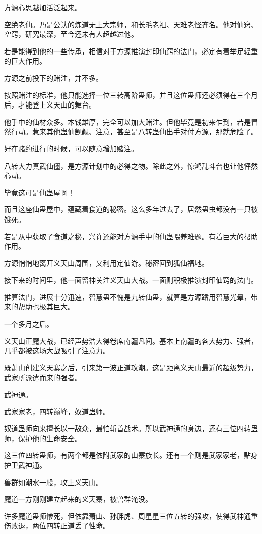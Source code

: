 \begin{this_body}
方源心思越加活泛起来。

空绝老仙。乃是公认的炼道无上大宗师，和长毛老祖、天难老怪齐名。他对仙窍、空窍，研究最深，至今还未有人超越过他。

若是能得到他的一些传承，相信对于方源推演封印仙窍的法门，必定有着举足轻重的巨大作用。

方源之前投下的赌注，并不多。

按照赌注的标准，他只能选择一位三转高阶蛊师，并且这位蛊师还必须得在三个月后，才能登上义天山的舞台。

他手中的仙材众多。本钱雄厚，完全可以加大赌注。但他毕竟是初来乍到，若是冒然行动。惹来其他蛊仙觊觎、注意，甚至是八转蛊仙出手对付方源，那就危险了。

好在赌约进行的时候，可以随意增加赌注。

八转大力真武仙僵，是方源计划中的必得之物。除此之外，惊鸿乱斗台也让他怦然心动。

毕竟这可是仙蛊屋啊！

而且这座仙蛊屋中，蕴藏着食道的秘密。这么多年过去了，居然蛊虫都没有一只被饿死。

若是从中获取了食道之秘，兴许还能对方源手中的仙蛊喂养难题。有着巨大的帮助作用。

方源悄悄地离开义天山周围，又利用定仙游。秘密回到狐仙福地。

接下来的时间里，他一面留神关注义天山大战。一面则积极推演封印仙窍的法门。

推算法门，进展十分迅速，智慧蛊不愧是九转仙蛊，就算是方源蹭用智慧光晕，带来的帮助也极其巨大。

一个多月之后。

义天山正魔大战，已经声势浩大得卷席南疆凡间。基本上南疆的各大势力、强者，几乎都被这场大战吸引了注意力。

既萧山创建义天寨之后，引来第一波正道攻潮。这是距离义天山最近的超级势力，武家所派遣而来的强者。

武神通。

武家家老，四转巅峰，奴道蛊师。

奴道蛊师向来擅长以一敌众，最怕斩首战术。所以武神通的身边，还有三位四转蛊师，保护他的生命安全。

这三位四转蛊师，有两个都是依附武家的山寨族长。还有一个则是武家家老，贴身护卫武神通。

兽群如潮水一般，攻上义天山。

魔道一方刚刚建立起来的义天寨，被兽群淹没。

许多魔道蛊师惨死，但依靠萧山、孙胖虎、周星星三位五转的强攻，使得武神通重伤败退，两位四转正道丢了性命。


\end{this_body}
